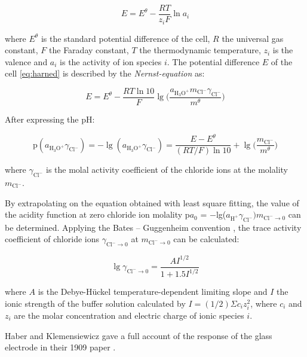 \documentclass[manuscript=article, journal=jceda8]{achemso}
\begin{document}
\begin{equation}
E = E^\theta - \frac{RT}{z_iF}\ln a_i
\end{equation}

where $E^\theta$ is the standard potential difference of the cell, $R$ the universal gas constant, $F$ the Faraday constant, $T$ the thermodynamic temperature, $z_i$ is the valence and $a_i$ is the activity of ion species $i$.
The potential difference $E$ of the cell \ref{eq:harned} is described by the \emph{Nernst-equation} as:

\begin{equation}
E = E^\theta - \frac{RT\ln 10}{F}\lg\bigg(\frac{a_{\textrm{H}_3\textrm{O}^+}m_{\textrm{Cl}^-}\gamma_{\textrm{Cl}^-}}{m^\theta}\bigg)
\end{equation}

After expressing the pH:

\begin{equation}
\textrm{p}(a_{\textrm{H}_3\textrm{O}^+}\gamma_{\textrm{Cl}^-}) = -\lg(a_{\textrm{H}_3\textrm{O}^+}\gamma_{\textrm{Cl}^-}) = \frac{E - E^\theta}{(RT/F)\ln10} + \lg \bigg(\frac{m_{\textrm{Cl}^-}}{m^\theta}\bigg)
\end{equation}

where $\gamma_{\textrm{Cl}^-}$ is the molal activity coefficient of the chloride ions at the molality $m_{\textrm{Cl}^-}$.

By extrapolating on the equation obtained with least square fitting, the value of the acidity function at zero chloride ion molality p$a_0$ = $-$lg($a_{\textrm{H}^+} \gamma _{\textrm{Cl}^-})m_{\textrm{Cl}^- \to 0}$ can be determined.
Applying the Bates -- Guggenheim convention \cite{bates1960report}, the trace activity coefficient of chloride ions $\gamma_{\textrm{Cl}^- \to 0}$ at $m_{\textrm{Cl}^- \to 0}$ can be calculated:

\begin{equation}
\lg \gamma_{\textrm{Cl}^- \to 0} = \frac{A I^{1/2}}{1 + 1.5I^{1/2}}
\end{equation}

where $A$ is the Debye-Hückel temperature-dependent limiting slope and $I$ the ionic strength of the buffer solution calculated by $I = (1/2) \Sigma c_i z_{i}^{2}$, where $c_i$ and $z_i$ are the molar concentration and electric charge of ionic species $i$.

Haber and Klemensiewicz gave a full account of the response of the glass electrode in their 1909 paper \cite{haber1909elektrische, haber1909concerning}.
\end{document}

